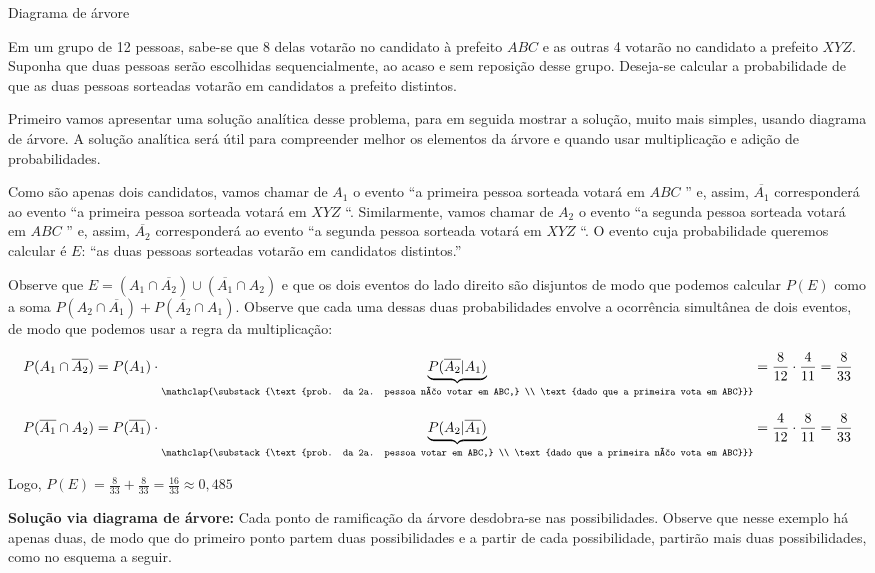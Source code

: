 \begin{example} {Diagrama de árvore}

Em um grupo de 12 pessoas, sabe-se que 8 delas votarão no candidato à prefeito  \(ABC\) e as outras 4 votarão no candidato a prefeito \(XYZ\). Suponha que duas pessoas serão escolhidas sequencialmente, ao acaso e sem reposição desse grupo. Deseja-se calcular a probabilidade de que as duas pessoas sorteadas votarão em candidatos a prefeito distintos.

Primeiro vamos apresentar uma solução analítica desse problema, para em seguida mostrar a solução, muito mais simples, usando diagrama de árvore. A solução analítica será útil para compreender melhor os elementos da árvore e quando usar multiplicação e adição de probabilidades.

Como são apenas dois candidatos, vamos chamar de \(A_1\) o evento “a primeira pessoa sorteada votará em \(ABC\) ”{} e, assim, \(\overline{A_1}\) corresponderá ao evento “a primeira pessoa sorteada votará em \(XYZ\) “. Similarmente, vamos chamar de \(A_2\) o evento “a segunda pessoa sorteada votará em \(ABC\) ”{} e, assim, \(\overline{A_2}\) corresponderá ao evento “a segunda pessoa sorteada votará em \(XYZ\) “. O evento cuja probabilidade queremos calcular é \(E\): “as duas pessoas sorteadas votarão em candidatos distintos.”

Observe que \(E=(A_1\cap \overline{A_2})\cup (\overline{A_1}\cap A_2)\)  e que os dois eventos do lado direito são disjuntos de modo que podemos calcular \(P(E)\) como a soma \(P(A_2\cap \overline{A_1})+P(\overline{A_2}\cap A_1)\). Observe que cada uma dessas duas probabilidades envolve a ocorrência simultânea de dois eventos, de modo que podemos usar a regra da multiplicação:

$$P(A_1\cap \overline{A_2})=P({A_1})\cdot \underbrace{P(\overline{A_2}|{A_1})}_{\mathclap{\substack{\text{prob. da 2a. pessoa não votar em ABC,} \\ \text{dado que a primeira vota em ABC}}}}=\frac{8}{12}\cdot\frac{4}{11}=\frac{8}{33}$$

$$P(\overline{A_1}\cap {A_2})=P(\overline{A_1})\cdot \underbrace{P({A_2}|\overline{A_1})}_{\mathclap{\substack{\text{prob. da 2a. pessoa votar em ABC,} \\ \text{dado que a primeira não vota em ABC}}}}=\frac{4}{12}\cdot\frac{8}{11}=\frac{8}{33}$$

Logo, \(\displaystyle{P(E)=\frac{8}{33}+\frac{8}{33}=\frac{16}{33}\approx 0,485}\)

\textbf{Solução via diagrama de árvore:} Cada ponto de ramificação da árvore desdobra-se nas possibilidades. Observe que nesse exemplo há apenas duas, de modo que do primeiro ponto partem duas possibilidades e a partir de cada possibilidade, partirão mais duas possibilidades, como no esquema a seguir.
\begin{figure}[H]
\centering


\end{figure}
\end{example}
